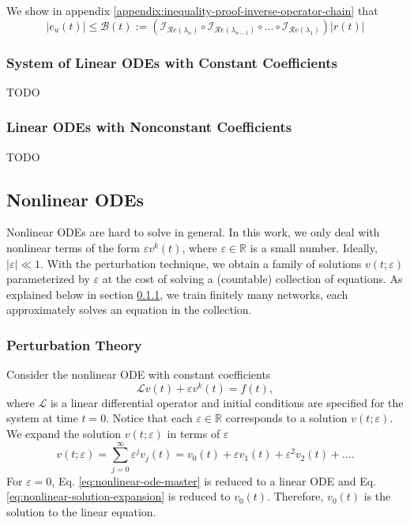 \documentclass{article}
\newcommand{\Err}{e}
\newcommand{\Bound}{\mathcal{B}}
\renewcommand{\L}{\mathcal{L}}
\newcommand{\I}{\mathcal{I}}
\renewcommand{\Re}[1]{\mathcal{R}e\left(#1\right)}
\begin{document}
    We show in appendix \ref{appendix:inequality-proof-inverse-operator-chain} that 
    \begin{equation} \label{eq:single-linear-ode-inverse-operator-inequality}
        |\Err_u(t)| \leq \Bound(t) := \left(\I_{\Re{\lambda_{n}}} \circ \I_{\Re{\lambda_{n-1}}} \circ \dots \circ \I_{\Re{\lambda_1}}\right) |r(t)|
    \end{equation}

\subsubsection{System of Linear ODEs with Constant Coefficients} \label{section:system-of-linear-odes-with-constant-coefficients}
    TODO

\subsubsection{Linear ODEs with Nonconstant Coefficients}
    TODO

\subsection{Nonlinear ODEs}
    Nonlinear ODEs are hard to solve in general. 
    In this work, we only deal with nonlinear terms of the form $\varepsilon v^k(t)$, where $\varepsilon \in \mathbb{R}$ is a small number. 
    Ideally, $|\varepsilon| \ll 1$. 
    With the perturbation technique, we obtain a family of solutions $v(t;\varepsilon)$ parameterized by $\varepsilon$ at the cost of solving a (countable) collection of equations. 
    As explained below in section \ref{section:perturbation-theory}, we train finitely many networks, each approximately solves an equation in the collection.

\subsubsection{Perturbation Theory} \label{section:perturbation-theory}
    Consider the nonlinear ODE with constant coefficients
    \begin{equation} \label{eq:nonlinear-ode-master}
        \L v(t) + \varepsilon v^k(t) = f(t),
    \end{equation}
    where $\L$ is a linear differential operator and initial conditions are specified for the system at time $t=0$. 
    Notice that each $\varepsilon \in \mathbb{R}$ corresponds to a solution $v(t; \varepsilon)$. 
    We expand the solution $v(t; \varepsilon)$ in terms of $\varepsilon$
    \begin{equation} \label{eq:nonlinear-solution-expansion}
        v(t; \varepsilon) = \sum_{j=0}^{\infty} \varepsilon^j v_j(t) = v_0(t) + \varepsilon v_1(t) + \varepsilon^2 v_2(t) + \dots.
    \end{equation}
    For $\varepsilon = 0$, Eq. \ref{eq:nonlinear-ode-master} is reduced to a linear ODE and Eq. \ref{eq:nonlinear-solution-expansion} is reduced to $v_0(t)$. Therefore, $v_0(t)$ is the solution to the linear equation. 
\end{document}
